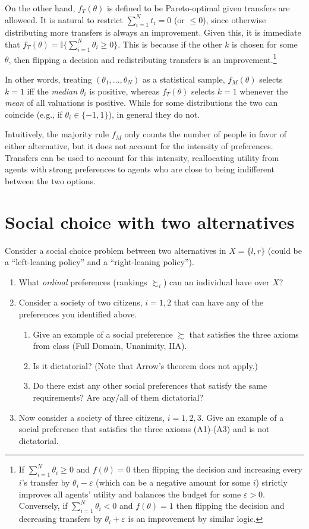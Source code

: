 \documentclass[a4paper]{article}
\begin{document}
On the other hand, $f_T(\theta)$ is defined to be Pareto-optimal given transfers are alloweed. It is natural to restrict $\sum_{i=1}^{N} t_i = 0$ (or $\leq 0$), since otherwise distributing more transfers is always an improvement. Given this, it is immediate that $f_T(\theta) = \mathbb{I} \{\sum_{i=1}^N \theta_i \geq 0 \}$. This is because if the other $k$ is chosen for some $\theta$, then flipping a decision and redistributing transfers is an improvement.\footnote{If $\sum_{i=1}^N \theta_i \geq 0$ and $f(\theta)=0$ then flipping the decision and increasing every $i$'s transfer by $\theta_i - \varepsilon$ (which can be a negative amount for some $i$) strictly improves all agents' utility and balances the budget for some $\varepsilon > 0$. Conversely, if $\sum_{i=1}^N \theta_i < 0$ and $f(\theta)=1$ then flipping the decision and decreasing transfers by $\theta_i + \varepsilon$ is an improvement by similar logic.}

In other words, treating $(\theta_1,...,\theta_N)$ as a statistical sample, $f_M(\theta)$ selects $k=1$ iff the \emph{median} $\theta_i$ is positive, whereas $f_T(\theta)$ selects $k=1$ whenever the \emph{mean} of all valuations is positive. While for some distributions the two can coincide (e.g., if $\theta_i \in \{-1,1\}$), in general they do not.

Intuitively, the majority rule $f_M$ only counts the number of people in favor of either alternative, but it does not account for the intensity of preferences. Transfers can be used to account for this intensity, reallocating utility from agents with strong preferences to agents who are close to being indifferent between the two options.
\fi 



\section{Social choice with two alternatives}
	Consider a social choice problem between two alternatives in $X = \{l, r\}$ (could be a ``left-leaning policy'' and a ``right-leaning policy'').
	\begin{enumerate}
		\item What \emph{ordinal} preferences (rankings $\succsim_i$) can an individual have over $X$?
		\item Consider a society of two citizens, $i=1,2$ that can have any of the preferences you identified above.
		\begin{enumerate}
			\item Give an example of a social preference $\succsim$ that satisfies the three axioms from class (Full Domain, Unanimity, IIA).
			\item Is it dictatorial? (Note that Arrow's theorem does not apply.)
			\item Do there exist any other social preferences that satisfy the same requirements? Are any/all of them dictatorial?
		\end{enumerate}
		\item Now consider a society of three citizens, $i=1,2,3$. Give an example of a social preference that satisfies the three axioms (A1)-(A3) and is not dictatorial.
	\end{enumerate}
\end{document}
